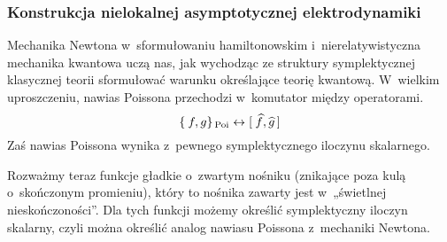 \documentclass[10pt,t]{beamer}
\begin{document}
\begin{frame}
  \frametitle{Konstrukcja nielokalnej asymptotycznej
    elektrodynamiki}


  Mechanika Newtona w~sformułowaniu hamiltonowskim i~nierelatywistyczna
  mechanika kwantowa uczą nas, jak wychodząc ze struktury symplektycznej
  klasycznej teorii sformułować warunku określające teorię kwantową.
  W~wielkim uproszczeniu, nawias Poissona przechodzi w~komutator między
  operatorami.
  \begin{equation}
    \label{eq:Wybrane-badania-ETC-01}
    \{ \hspace{0.22em} f, g \}_{ \, \text{Poi} } \leftrightarrow
    [ \hspace{0.25em} \widehat{ f }, \widehat{ g } \, ]
  \end{equation}
  Zaś nawias Poissona wynika z~pewnego symplektycznego iloczynu skalarnego.

  Rozważmy teraz funkcje gładkie o~zwartym nośniku (znikające poza kulą
  o~skończonym promieniu), który to nośnika zawarty jest  w~„świetlnej
  nieskończoności”. Dla tych funkcji możemy określić symplektyczny iloczyn
  skalarny, czyli można określić analog nawiasu Poissona z~mechaniki
  Newtona.

\end{frame}









\end{document}
